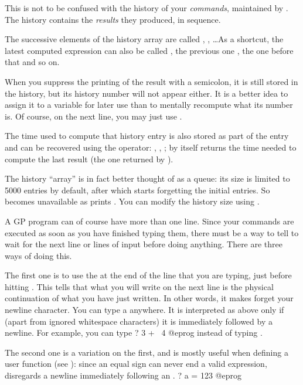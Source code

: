 
This is not to be confused with the history of your \emph{commands},
maintained by . The  history contains the \emph{results}
they produced, in sequence.

The successive elements of the history array are called , ,
\dots As a shortcut, the latest computed expression can also be
called \kbd{\%}, the previous one ,
the one before that  and so on.

When you suppress the printing of the result with a semicolon, it is still
stored in the history, but its history number will not appear either. It is a
better idea to assign it to a variable for later use than to mentally
recompute what its number is. Of course, on the next line, you may just use
\kbd{\%}.

The time used to compute that history entry is also stored as part of the entry
and can be recovered using the \kbd{\%\#} operator: , ,
; \kbd{\%\#} by itself returns the time needed to compute the last
result (the one returned by \kbd{\%}).

The history ``array'' is in fact better thought of as a queue: its size is
limited to 5000 entries by default, after which  starts forgetting
the initial entries. So  becomes unavailable as  prints
. You can modify the history size using .

 A GP program
can of course have more than one line. Since your commands are executed as
soon as you have finished typing them, there must be a way to tell 
to wait for the next line or lines of input before doing anything. There are
three ways of doing this.

The first one is to use the  \kbd{\bs} at the end of
the line that you are typing, just before hitting . This tells
 that what you will write on the next line is the physical
continuation of what you have just written. In other words, it makes 
forget your newline character. You can type a \kbd{\bs} anywhere. It is
interpreted as above only if (apart from ignored whitespace characters) it is
immediately followed by a newline. For example, you can type
\bprog
? 3 + \
4
@eprog
\noindent instead of typing .

The second one is a variation on the first, and is mostly useful when
defining a user function (see \secref{se:user_defined}): since an equal sign
can never end a valid expression, \kbd{gp} disregards a newline immediately
following an \kbd{=}.
\bprog
? a =
123
@eprog

